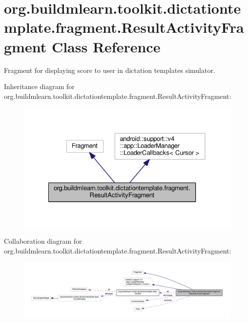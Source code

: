 \hypertarget{classorg_1_1buildmlearn_1_1toolkit_1_1dictationtemplate_1_1fragment_1_1ResultActivityFragment}{}\section{org.\+buildmlearn.\+toolkit.\+dictationtemplate.\+fragment.\+Result\+Activity\+Fragment Class Reference}
\label{classorg_1_1buildmlearn_1_1toolkit_1_1dictationtemplate_1_1fragment_1_1ResultActivityFragment}


Fragment for displaying score to user in dictation template\textquotesingle{}s simulator.  




Inheritance diagram for org.\+buildmlearn.\+toolkit.\+dictationtemplate.\+fragment.\+Result\+Activity\+Fragment\+:
\nopagebreak
\begin{figure}[H]
\begin{center}
\leavevmode
\includegraphics[width=328pt]{classorg_1_1buildmlearn_1_1toolkit_1_1dictationtemplate_1_1fragment_1_1ResultActivityFragment__inherit__graph}
\end{center}
\end{figure}


Collaboration diagram for org.\+buildmlearn.\+toolkit.\+dictationtemplate.\+fragment.\+Result\+Activity\+Fragment\+:
\nopagebreak
\begin{figure}[H]
\begin{center}
\leavevmode
\includegraphics[width=350pt]{classorg_1_1buildmlearn_1_1toolkit_1_1dictationtemplate_1_1fragment_1_1ResultActivityFragment__coll__graph}
\end{center}
\end{figure}
